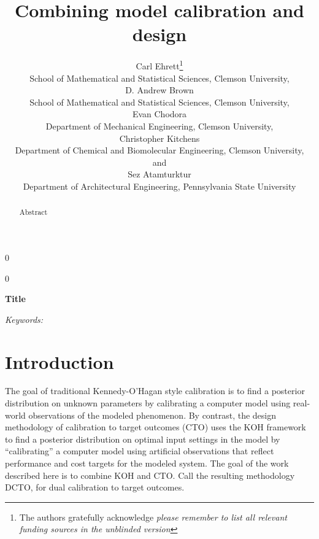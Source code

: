 \documentclass[12pt]{article}
\newcommand{\blind}{0}
\begin{document}
%

\def\spacingset#1{\renewcommand{\baselinestretch}%
{#1}\small\normalsize} \spacingset{1}



\blind
{
  \title{\bf Combining model calibration and design}
  \author{Carl Ehrett\thanks{
    The authors gratefully acknowledge \textit{please remember to list all relevant funding sources in the unblinded version}}\hspace{.2cm}\\
    School of Mathematical and Statistical Sciences, Clemson University,\\
    D. Andrew Brown \\
    School of Mathematical and Statistical Sciences, Clemson University,\\
    Evan Chodora \\
    Department of Mechanical Engineering, Clemson University,\\
    Christopher Kitchens \\
    Department of Chemical and Biomolecular Engineering, Clemson University,\\
    and \\
    Sez Atamturktur \\
    Department of Architectural Engineering, Pennsylvania State University\\}
  \maketitle
} \fi

\blind
{
  \bigskip
  \bigskip
  \bigskip
  \begin{center}
    {\LARGE\bf Title}
\end{center}
  \medskip
} \fi

\bigskip
\begin{abstract}
Abstract
\end{abstract}

\noindent%
{\it Keywords:}  
\vfill

\newpage
\spacingset{2} %
\section{Introduction}
\label{introduction}

%
The goal of traditional Kennedy-O'Hagan style calibration \citep[KOH, ][]{kennedy2001} is to find a posterior distribution on unknown parameters by calibrating a computer model using real-world observations of the modeled phenomenon.
%
By contrast, the design methodology of calibration to target outcomes (CTO) uses the KOH framework to find a posterior distribution on optimal input settings in the model by ``calibrating'' a computer model using artificial observations that reflect performance and cost targets for the modeled system.
%
The goal of the work described here is to combine KOH and CTO.
%
Call the resulting methodology DCTO, for dual calibration to target outcomes.
\end{document}
